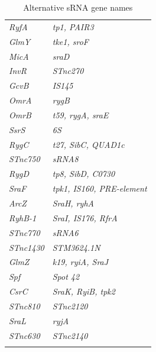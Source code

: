 \begin{footnotesize}
\begin{longtable}{ll}
\textit{RyfA}& \textit{tp1, PAIR3} \\
\textit{GlmY}& \textit{tke1, sroF} \\
\textit{MicA}& \textit{sraD} \\
\textit{InvR}& \textit{STnc270} \\
\textit{GcvB}& \textit{IS145} \\
\textit{OmrA}& \textit{rygB} \\ 
\textit{OmrB}& \textit{t59, rygA, sraE} \\
\textit{SsrS}& \textit{6S} \\
\textit{RygC}& \textit{t27, SibC, QUAD1c} \\
\textit{STnc750}& \textit{sRNA8} \\
\textit{RygD}& \textit{tp8, SibD, C0730} \\
\textit{SraF} & \textit{tpk1, IS160, PRE-element} \\
\textit{ArcZ}& \textit{SraH, ryhA} \\
\textit{RyhB-1}& \textit{SraI, IS176, RfrA} \\
\textit{STnc770}& \textit{sRNA6} \\
\textit{STnc1430}& \textit{STM3624.1N} \\
\textit{GlmZ}& \textit{k19, ryiA, SraJ} \\
\textit{Spf}& \textit{Spot 42} \\
\textit{CsrC}& \textit{SraK, RyiB, tpk2} \\
\textit{STnc810}& \textit{STnc2120} \\
\textit{SraL}& \textit{ryjA} \\
\textit{STnc630}& \textit{STnc2140} \\
\bottomrule
    \caption[Alternative sRNA gene names]{Alternative sRNA gene names}
    \label{tab:sRNA_alternative_names}
\end{longtable}
\end{footnotesize}
